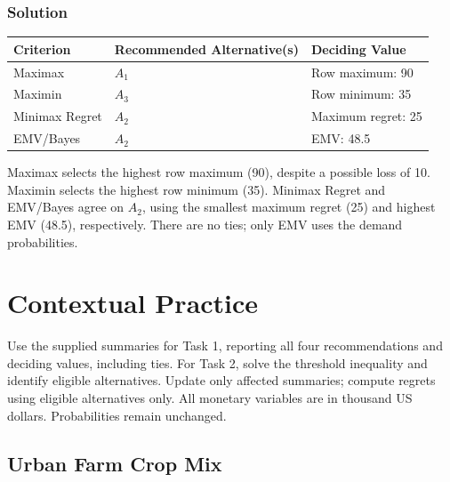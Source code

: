 \subsubsection*{Solution}
\label{subsec:c8-bakery-solution}
\begin{center}
\begin{tabular}{lll}\toprule
Criterion & Recommended Alternative(s) & Deciding Value\\\midrule
Maximax & $A_1$ & Row maximum: 90\\
Maximin & $A_3$ & Row minimum: 35\\
Minimax Regret & $A_2$ & Maximum regret: 25\\
EMV/Bayes & $A_2$ & EMV: 48.5\\\bottomrule
\end{tabular}
\end{center}
Maximax selects the highest row maximum (90), despite a possible loss of 10. Maximin selects the highest row minimum (35). Minimax Regret and EMV/Bayes agree on $A_2$, using the smallest maximum regret (25) and highest EMV (48.5), respectively. There are no ties; only EMV uses the demand probabilities.


\section{Contextual Practice}\label{sec:c8-contextual}
\vspace{4mm}

Use the supplied summaries for Task 1, reporting all four recommendations and deciding values, including ties. For Task 2, solve the threshold inequality and identify eligible alternatives. Update only affected summaries; compute regrets using eligible alternatives only. All monetary variables are in thousand US dollars. Probabilities remain unchanged.





\subsection{Urban Farm Crop Mix}\label{sec:c8-farm}

